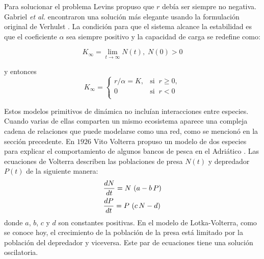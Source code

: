 Para solucionar el problema Levins propuso que $r$ debía ser siempre no negativa. Gabriel \emph{et al.} encontraron una solución más elegante usando la formulación original de Verhulst \cite{gabriel2005paradoxes}. La condición para que el sistema alcance la estabilidad es que el coeficiente $\alpha$ sea siempre positivo y la capacidad de carga se redefine como:

\begin{equation}
K_{\infty}=\lim_{t\rightarrow\infty}N(t),\; N(0)>0
\end{equation}

\noindent y entonces
\begin{equation*}
K_{\infty}=\left\{
\begin{array}{ll}
  r / \alpha  = K, & \mathrm{si} \;\; r \geq 0, \\ 0  & \mathrm{si} \;\; r < 0 \\
  \end{array} \right.
\end{equation*}

Estos modelos primitivos de dinámica no incluían interacciones entre especies. Cuando varias de ellas comparten un mismo ecosistema aparece una compleja cadena de relaciones que puede modelarse como una red, como se mencionó en la sección precedente. En $1926$ Vito Volterra propuso un modelo de dos especies para explicar el comportamiento de algunos bancos de pesca en el Adriático \cite{volterra1926}. Las ecuaciones de Volterra describen las poblaciones de presa $N(t)$ y depredador $P(t)$ de la siguiente manera: 
\begin{align}
\displaystyle &\frac{dN}{dt}=N\, \left(a-b \,P\right) \nonumber\\
\displaystyle &\frac{dP}{dt}=P\, \left(c\, N-d\right) 
\label{myeq1}
\end{align}
\noindent donde $a$, $b$, $c$ y $d$ son constantes positivas. En el modelo de Lotka-Volterra, como se conoce hoy, el crecimiento de la población de la presa está limitado por la población del depredador y viceversa. Este par de ecuaciones tiene una solución oscilatoria.


